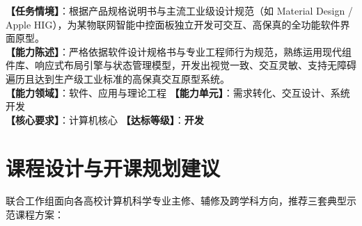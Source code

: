 \begin{taskbox}
\textbf{【任务情境】}：根据产品规格说明书与主流工业级设计规范（如 Material Design / Apple HIG），为某物联网智能中控面板独立开发可交互、高保真的全功能软件界面原型。\\
\textbf{【能力陈述】}：严格依据软件设计规格书与专业工程师行为规范，熟练运用现代组件库、响应式布局引擎与状态管理模型，开发出视觉一致、交互灵敏、支持无障碍遍历且达到生产级工业标准的高保真交互原型系统。\\
\textbf{【能力领域】}：软件、应用与理论工程 \quad \textbf{【能力单元】}：需求转化、交互设计、系统开发\\
\textbf{【核心要求】}：计算机核心 \quad \textbf{【达标等级】}：\textbf{开发}
\end{taskbox}

\section{课程设计与开课规划建议}

联合工作组面向各高校计算机科学专业主修、辅修及跨学科方向，推荐三套典型示范课程方案：

